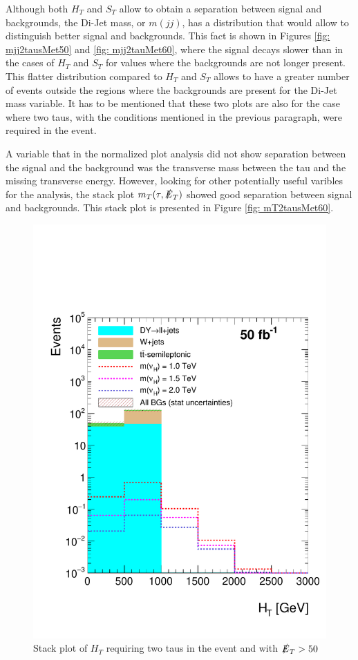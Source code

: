 Although both $H_{T}$ and $S_{T}$ allow to obtain a separation between signal and backgrounds, the Di-Jet mass, or $m(jj)$, has a distribution that would allow to distinguish better signal and backgrounds. This fact is shown in Figures \ref{fig: mjj2tausMet50} and \ref{fig: mjj2tauMet60}, where the signal decays slower than in the cases of $H_{T}$ and $S_{T}$ for values where the backgrounds are not longer present. This flatter distribution compared to $H_{T}$ and $S_{T}$ allows to have a greater number of events outside the regions where the backgrounds are present for the Di-Jet mass variable. It has to be mentioned that these two plots are also for the case where two taus, with the conditions mentioned in the previous paragraph, were required in the event. 

A variable that in the normalized plot analysis did not show separation between the signal and the background was the transverse mass between the tau and the missing transverse energy. However, looking for other potentially useful varibles for the analysis, the stack plot $m_{T}(\tau, \slashed{E}_{T})$ showed good separation between signal and backgrounds. This stack plot is presented in Figure \ref{fig: mT2tausMet60}. 
 

\begin{figure}[H]
\centering
\includegraphics[width=\linewidth]{StackPlots/HT_2taus_met50_50ifb.pdf}
\caption{Stack plot of $H_{T}$ requiring two taus in the event and with $\slashed{E}_{T} > 50$}
\label{fig: HT2tausMet50}
\end{figure}

